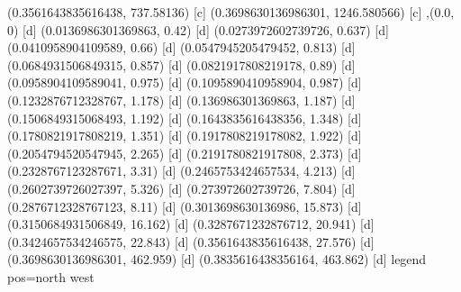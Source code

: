 {{{(0.3561643835616438, 737.58136) [c] 
(0.3698630136986301, 1246.580566) [c] 
},{(0.0, 0) [d] 
(0.0136986301369863, 0.42) [d] 
(0.0273972602739726, 0.637) [d] 
(0.0410958904109589, 0.66) [d] 
(0.0547945205479452, 0.813) [d] 
(0.0684931506849315, 0.857) [d] 
(0.0821917808219178, 0.89) [d] 
(0.0958904109589041, 0.975) [d] 
(0.1095890410958904, 0.987) [d] 
(0.1232876712328767, 1.178) [d] 
(0.136986301369863, 1.187) [d] 
(0.1506849315068493, 1.192) [d] 
(0.1643835616438356, 1.348) [d] 
(0.1780821917808219, 1.351) [d] 
(0.1917808219178082, 1.922) [d] 
(0.2054794520547945, 2.265) [d] 
(0.2191780821917808, 2.373) [d] 
(0.2328767123287671, 3.31) [d] 
(0.2465753424657534, 4.213) [d] 
(0.2602739726027397, 5.326) [d] 
(0.273972602739726, 7.804) [d] 
(0.2876712328767123, 8.11) [d] 
(0.3013698630136986, 15.873) [d] 
(0.3150684931506849, 16.162) [d] 
(0.3287671232876712, 20.941) [d] 
(0.3424657534246575, 22.843) [d] 
(0.3561643835616438, 27.576) [d] 
(0.3698630136986301, 462.959) [d] 
(0.3835616438356164, 463.862) [d] 
}}}{legend pos=north west}
